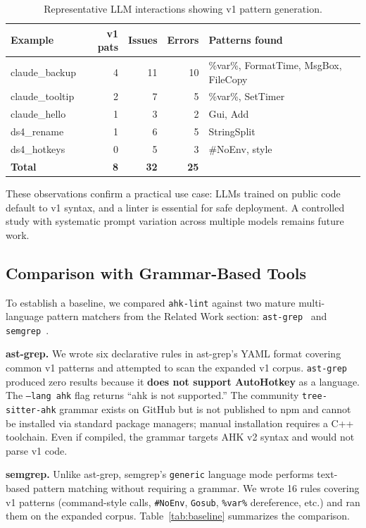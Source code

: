\documentclass[11pt,a4paper]{article}
\begin{document}
\begin{enumerate}
\begin{table}[h]
\centering\small
\caption{Representative LLM interactions showing v1 pattern generation.}
\label{tab:llm}
\begin{tabular}{lrrrl}
\toprule
\textbf{Example} & \textbf{v1 pats} & \textbf{Issues} & \textbf{Errors} & \textbf{Patterns found} \\
\midrule
claude\_backup & 4 & 11 & 10 & \%var\%, FormatTime, MsgBox, FileCopy \\
claude\_tooltip & 2 & 7 & 5 & \%var\%, SetTimer \\
claude\_hello & 1 & 3 & 2 & Gui, Add \\
ds4\_rename & 1 & 6 & 5 & StringSplit \\
ds4\_hotkeys & 0 & 5 & 3 & \#NoEnv, style \\
\midrule
\textbf{Total} & \textbf{8} & \textbf{32} & \textbf{25} & \\
\bottomrule
\end{tabular}
\end{table}

These observations confirm a practical use case: LLMs trained on public code default to v1 syntax, and a linter is essential for safe deployment. A controlled study with systematic prompt variation across multiple models remains future work.

\subsection{Comparison with Grammar-Based Tools}

To establish a baseline, we compared \texttt{ahk-lint} against two mature multi-language pattern matchers from the Related Work section: \texttt{ast-grep}~\cite{astgrep} and \texttt{semgrep}~\cite{semgrep}.

\textbf{ast-grep.} We wrote six declarative rules in ast-grep's YAML format covering common v1 patterns and attempted to scan the expanded v1 corpus. \texttt{ast-grep} produced zero results because it \textbf{does not support AutoHotkey} as a language. The \texttt{--lang ahk} flag returns ``ahk is not supported.'' The community \texttt{tree-sitter-ahk} grammar exists on GitHub but is not published to npm and cannot be installed via standard package managers; manual installation requires a C++ toolchain. Even if compiled, the grammar targets AHK v2 syntax and would not parse v1 code.

\textbf{semgrep.} Unlike ast-grep, semgrep's \texttt{generic} language mode performs text-based pattern matching without requiring a grammar. We wrote 16 rules covering v1 patterns (command-style calls, \texttt{\#NoEnv}, \texttt{Gosub}, \texttt{\%var\%} dereference, etc.) and ran them on the expanded corpus. Table~\ref{tab:baseline} summarizes the comparison.


\end{enumerate}
\end{document}
